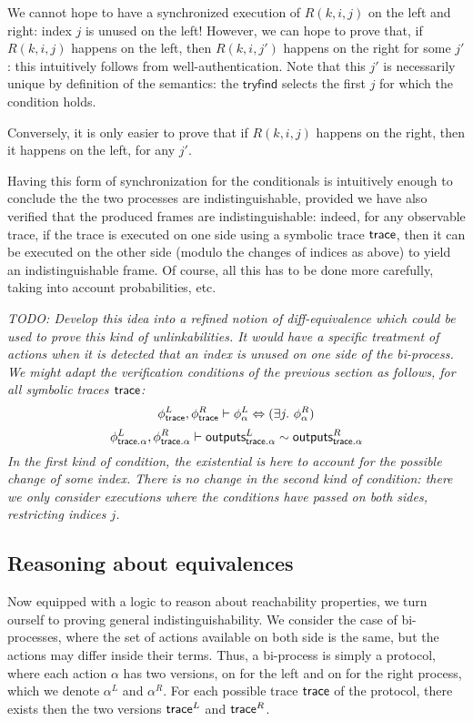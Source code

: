 We cannot hope to have a synchronized execution of $R(k,i,j)$ on the
left and right: index $j$ is unused on the left!
However, we can hope to prove that, if $R(k,i,j)$ happens on the left,
then $R(k,i,j')$ happens on the right for some $j'$: this intuitively
follows from well-authentication.
Note that this $j'$ is necessarily unique by definition of the semantics:
the $\mathsf{tryfind}$ selects the first $j$ for which the condition holds.

Conversely, it is only easier to prove that if $R(k,i,j)$ happens
on the right, then it happens on the left, for any $j'$.

Having this form of synchronization for the conditionals is intuitively
enough to conclude the the two processes are indistinguishable,
provided we have also verified that the produced frames are indistinguishable:
indeed, for any observable trace, if the trace is executed on one side
using a symbolic trace $\textsf{trace}$, then it can be executed on the other side
(modulo the changes of indices as above) to yield an indistinguishable
frame. Of course, all this has to be done more carefully, taking into
account probabilities, etc.

\emph{TODO: Develop this idea into a refined notion of diff-equivalence
which could be used to prove this kind of unlinkabilities. It would have
a specific treatment of actions when it is detected that an index is unused
on one side of the bi-process. We might adapt the verification conditions
of the previous section as follows, for all symbolic traces $\textsf{trace}$:}
$$ \phi^L_{\textsf{trace}}, \phi^R_{\textsf{trace}} \vdash
   \phi^L_\alpha \Leftrightarrow (\exists j.~ \phi^R_\alpha) $$
$$ \phi^L_{\textsf{trace}.\alpha}, \phi^R_{\textsf{trace}.\alpha} \vdash 
   \textsf{outputs}_{\textsf{trace}.\alpha}^L \sim \textsf{outputs}_{\textsf{trace}.\alpha}^R $$
\emph{In the first kind of condition, the existential is here to account
for the possible change of some index. There is no change in the second
kind of condition: there we only consider executions where the conditions
have passed on both sides, restricting indices $j$.}

\subsection{Reasoning about equivalences}

Now equipped with a logic to reason about reachability properties, we turn 
ourself to proving general indistinguishability. We consider the case of 
bi-processes, where the set of actions available on both side is the same, but 
the actions may differ inside their terms. Thus, a bi-process is simply a 
protocol, where each action $\alpha$ has two versions, on for the left and on 
for the right process, which we denote $\alpha^L$ and $\alpha^R$. For each 
possible trace $\textsf{trace}$ of the protocol, there exists then the two versions 
$\textsf{trace}^L$ and $\textsf{trace}^R$.

